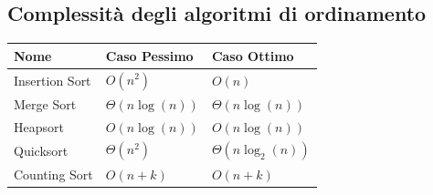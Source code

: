 \documentclass[10pt,a4paper]{article}
\begin{document}
\subsection*{Complessit\`a degli algoritmi di ordinamento}
\begin{tabular}{l l l}
    Nome & Caso Pessimo & Caso Ottimo\\
    \hline
    Insertion Sort & $O(n^2)$ & $O(n)$\\
    Merge Sort & $\varTheta(n\log(n))$ & $\varTheta(n\log(n))$\\
    Heapsort & $O(n\log(n))$ & $O(n\log(n))$\\
    Quicksort & $\varTheta(n^2)$ & $\varTheta(n\log_2(n))$ \\
    Counting Sort & $O(n+k)$ & $O(n+k)$ \\

\end{tabular}

\pagebreak
\end{document}
